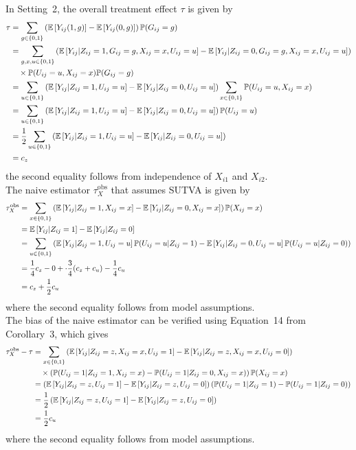 \documentclass[10pt]{article}
\begin{document}
In Setting~2, the overall treatment effect $\tau$ is given by
\begin{align*}
\tau &= \sum_{g\in\{0,1\}} \left(\mathbb{E}\left[Y_{ij}(1,g)\right] - \mathbb{E}\left[Y_{ij}(0,g)\right]\right)\mathbb{P}(G_{ij}=g) \\
&= \sum_{g,x,u\in\{0,1\}} \left(\mathbb{E}\left[Y_{ij}|Z_{ij}=1,G_{ij}=g,X_{ij}=x,U_{ij}=u\right] - \mathbb{E}\left[Y_{ij}|Z_{ij}=0,G_{ij}=g,X_{ij}=x,U_{ij}=u\right]\right) \\
&\quad \times \mathbb{P}(U_{ij}=u,X_{ij}=x)\mathbb{P}(G_{ij}=g) \\
&= \sum_{u\in\{0,1\}} \left(\mathbb{E}\left[Y_{ij}|Z_{ij}=1,U_{ij}=u\right] - \mathbb{E}\left[Y_{ij}|Z_{ij}=0,U_{ij}=u\right]\right) \sum_{x\in\{0,1\}}\mathbb{P}(U_{ij}=u,X_{ij}=x) \\
&= \sum_{u\in\{0,1\}} \left(\mathbb{E}\left[Y_{ij}|Z_{ij}=1,U_{ij}=u\right] - \mathbb{E}\left[Y_{ij}|Z_{ij}=0,U_{ij}=u\right]\right)\mathbb{P}(U_{ij}=u) \\
&= \frac{1}{2}\sum_{u\in\{0,1\}} \left(\mathbb{E}\left[Y_{ij}|Z_{ij}=1,U_{ij}=u\right] - \mathbb{E}\left[Y_{ij}|Z_{ij}=0,U_{ij}=u\right]\right) \\
&= c_z
\end{align*}
the second equality follows from independence of $X_{i1}$ and $X_{i2}$.
\\

The naive estimator $\tau_{X}^\text{obs}$ that assumes SUTVA is given by
\begin{align*}
\tau_{X}^\text{obs} &= \sum_{x\in\{0,1\}}\left(\mathbb{E}\left[Y_{ij}|Z_{ij}=1,X_{ij}=x\right] - \mathbb{E}\left[Y_{ij}|Z_{ij}=0,X_{ij}=x\right]\right)\mathbb{P}(X_{ij}=x) \\
&= \mathbb{E}\left[Y_{ij}|Z_{ij}=1\right] - \mathbb{E}\left[Y_{ij}|Z_{ij}=0\right] \\
&= \sum_{u\in\{0,1\}}\left(\mathbb{E}\left[Y_{ij}|Z_{ij}=1,U_{ij}=u\right]\mathbb{P}(U_{ij}=u|Z_{ij}=1)  - \mathbb{E}\left[Y_{ij}|Z_{ij}=0,U_{ij}=u\right]\mathbb{P}(U_{ij}=u|Z_{ij}=0)\right) \\
&= \frac{1}{4}c_z - 0 + \cdot\frac{3}{4}(c_z+c_u) - \frac{1}{4}c_u \\
&= c_z + \frac{1}{2}c_u
\end{align*}
where the second equality follows from model assumptions.
\\

The bias of the naive estimator can be verified using Equation~14 from Corollary~3, which gives
\begin{align*}
\tau_{X}^\text{obs} - \tau &= \sum_{x\in\{0,1\}}\left(\mathbb{E}\left[Y_{ij}|Z_{ij}=z,X_{ij}=x,U_{ij}=1\right]-\mathbb{E}\left[Y_{ij}|Z_{ij}=z,X_{ij}=x,U_{ij}=0\right]\right) \\
&\quad \times\left(\mathbb{P}(U_{ij}=1|Z_{ij}=1,X_{ij}=x)-\mathbb{P}(U_{ij}=1|Z_{ij}=0,X_{ij}=x)\right)\mathbb{P}(X_{ij}=x) \\
&= \left(\mathbb{E}\left[Y_{ij}|Z_{ij}=z,U_{ij}=1\right]-\mathbb{E}\left[Y_{ij}|Z_{ij}=z,U_{ij}=0\right]\right)\left(\mathbb{P}(U_{ij}=1|Z_{ij}=1)-\mathbb{P}(U_{ij}=1|Z_{ij}=0)\right) \\
&= \frac{1}{2}\left(\mathbb{E}\left[Y_{ij}|Z_{ij}=z,U_{ij}=1\right]-\mathbb{E}\left[Y_{ij}|Z_{ij}=z,U_{ij}=0\right]\right) \\
&=\frac{1}{2}c_u
\end{align*}
where the second equality follows from model assumptions.
\end{document}
